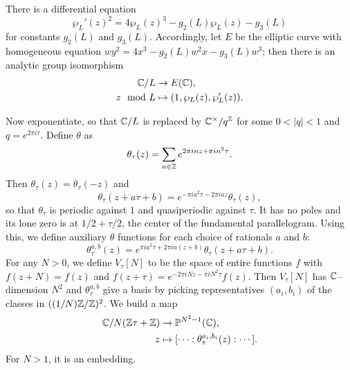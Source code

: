 There is a differential equation \[\wp_L'(z)^2 = 4 \wp_L(z)^3 - g_2(L) \wp_L(z) - g_3(L)\] for constants $g_2(L)$ and $g_3(L)$.  Accordingly, let $E$ be the elliptic curve with homogeneous equation $wy^2 = 4x^3 - g_2(L) w^2 x - g_3(L) w^3$; then there is an analytic group isomorphism
\begin{align*}
\mathbb{C} / L & \to E(\mathbb{C}), \\
z \mod L & \mapsto (1, \wp_L(z), \wp_L'(z)).
\end{align*}

Now exponentiate, so that $\mathbb{C} / L$ is replaced by $\mathbb{C}^\times / q^{\mathbb Z}$ for some $0 < |q| < 1$ and $q = e^{2 \pi i \tau}$.  Define $\theta$ as \[\theta_\tau(z) = \sum_{n \in \mathbb Z} e^{2 \pi i n z + \pi i n^2 \tau}.\]  Then $\theta_\tau(z) = \theta_\tau(-z)$ and \[\theta_\tau(z + a \tau + b) = e^{-\pi i a^2 \tau - 2 \pi i a z} \theta_\tau(z),\] so that $\theta_\tau$ is periodic against $1$ and quasiperiodic against $\tau$.  It has no poles and its lone zero is at $1/2 + \tau/2$, the center of the fundamental parallelogram.  Using this, we define auxiliary $\theta$ functions for each choice of rationals $a$ and $b$: \[\theta_\tau^{a,b}(z) = e^{\pi i a^2 \tau + 2 \pi i a (z + b)} \theta_\tau(z + a \tau + b).\]  For any $N > 0$, we define $V_\tau[N]$ to be the space of entire functions $f$ with $f(z + N) = f(z)$ and $f(z + \tau) = e^{-2 \pi i N z - \pi i N^2 \tau} f(z)$.  Then $V_\tau[N]$ has $\mathbb{C}$--dimension $N^2$ and $\theta_\tau^{a, b}$ give a basis by picking representatives $(a_i, b_i)$ of the classes in $((1/N)\mathbb Z / \mathbb Z)^2$.  We build a map
\begin{align*}
\mathbb{C} / N(\mathbb Z \tau + \mathbb Z) & \to \mathbb{P}^{N^2-1}(\mathbb{C}), \\
z & \mapsto [\cdots : \theta_\tau^{a_i, b_i}(z) : \cdots].
\end{align*}
For $N > 1$, it is an embedding.

